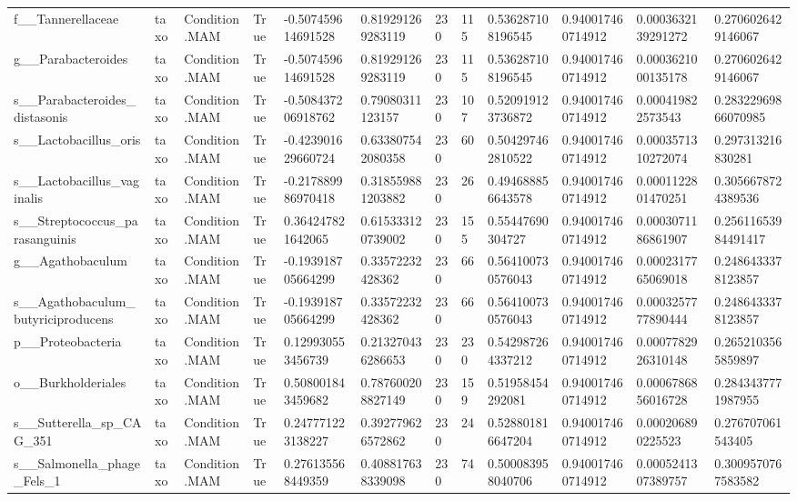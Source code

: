 \begin{longtable}{llllllllllll}
f\_\_Tannerellaceae & taxo & Condition.MAM & True & -0.507459614691528 & 0.819291269283119 & 230 & 115 & 0.536287108196545 & 0.940017460714912 & 0.0003632139291272 & 0.2706026429146067 \\
g\_\_Parabacteroides & taxo & Condition.MAM & True & -0.507459614691528 & 0.819291269283119 & 230 & 115 & 0.536287108196545 & 0.940017460714912 & 0.0003621000135178 & 0.2706026429146067 \\
s\_\_Parabacteroides\_distasonis & taxo & Condition.MAM & True & -0.508437206918762 & 0.79080311123157 & 230 & 107 & 0.520919123736872 & 0.940017460714912 & 0.000419822573543 & 0.28322969866070985 \\
s\_\_Lactobacillus\_oris & taxo & Condition.MAM & True & -0.423901629660724 & 0.633807542080358 & 230 & 60 & 0.504297462810522 & 0.940017460714912 & 0.0003571310272074 & 0.297313216830281 \\
s\_\_Lactobacillus\_vaginalis & taxo & Condition.MAM & True & -0.217889986970418 & 0.318559881203882 & 230 & 26 & 0.494688856643578 & 0.940017460714912 & 0.0001122801470251 & 0.3056678724389536 \\
s\_\_Streptococcus\_parasanguinis & taxo & Condition.MAM & True & 0.364247821642065 & 0.615333120739002 & 230 & 155 & 0.55447690304727 & 0.940017460714912 & 0.0003071186861907 & 0.25611653984491417 \\
g\_\_Agathobaculum & taxo & Condition.MAM & True & -0.193918705664299 & 0.33572232428362 & 230 & 66 & 0.564100730576043 & 0.940017460714912 & 0.0002317765069018 & 0.2486433378123857 \\
s\_\_Agathobaculum\_butyriciproducens & taxo & Condition.MAM & True & -0.193918705664299 & 0.33572232428362 & 230 & 66 & 0.564100730576043 & 0.940017460714912 & 0.0003257777890444 & 0.2486433378123857 \\
p\_\_Proteobacteria & taxo & Condition.MAM & True & 0.129930553456739 & 0.213270436286653 & 230 & 230 & 0.542987264337212 & 0.940017460714912 & 0.0007782926310148 & 0.2652103565859897 \\
o\_\_Burkholderiales & taxo & Condition.MAM & True & 0.508001843459682 & 0.787600208827149 & 230 & 159 & 0.51958454292081 & 0.940017460714912 & 0.0006786856016728 & 0.2843437771987955 \\
s\_\_Sutterella\_sp\_CAG\_351 & taxo & Condition.MAM & True & 0.247771223138227 & 0.392779626572862 & 230 & 24 & 0.528801816647204 & 0.940017460714912 & 0.000206890225523 & 0.276707061543405 \\
s\_\_Salmonella\_phage\_Fels\_1 & taxo & Condition.MAM & True & 0.276135568449359 & 0.408817638339098 & 230 & 74 & 0.500083958040706 & 0.940017460714912 & 0.0005241307389757 & 0.3009570767583582 \\

\end{longtable}
